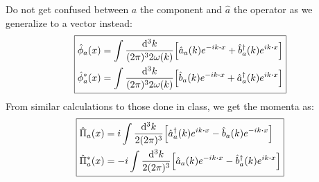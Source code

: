 \documentclass[12pt]{article}
\newcommand{\phih}{\hat{\phi}}
\newcommand{\phish}{\hat{\phi}^*}
\newcommand{\pih}{\hat{\Pi}}
\newcommand{\pish}{\hat{\Pi}^*}
\newcommand{\ahat}{\hat{a}}
\newcommand{\ahatd}{\hat{a}^\dag}
\newcommand{\bhat}{\hat{b}}
\newcommand{\bhatd}{\hat{b}^\dag}
\newcommand{\intk}{\int\frac{\dd[3]{k}}{(2\pi)^32\omega(k)}}
\newcommand{\intkp}{\int\frac{\dd[3]{k}}{2(2\pi)^3}}
\begin{document}
Do not get confused between $a$ the component and $\ahat$ the operator as we generalize to a vector instead:
\begin{equation*}
  \boxed {
    \begin{aligned}
      \phih_a(x)&=\intk\qty[\ahat_a(k)e^{-ik\vdot x}+\bhatd_a(k)e^{ik\vdot x}]\\
      \phish_a(x)&=\intk\qty[\bhat_a(k)e^{-ik\vdot x}+\ahatd_a(k)e^{ik\vdot x}]
    \end{aligned}
  }
\end{equation*}
From similar calculations to those done in class, we get the momenta as:
\begin{equation*}
  \boxed{
    \begin{aligned}
      \pih_a(x)&=i\intkp\qty[\ahatd_a(k)e^{ik\vdot x}-\bhat_a(k)e^{-ik\vdot x}]\\
      \pish_a(x)&=-i\intkp\qty[\ahat_a(k)e^{-ik\vdot x}-\bhatd_a(k)e^{ik\vdot x}]
    \end{aligned}
  }
\end{equation*}
\end{document}
